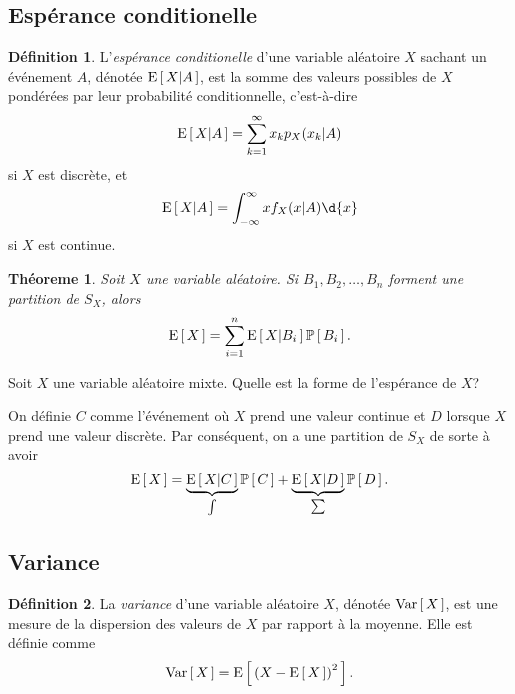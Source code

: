 \documentclass[11pt]{article}
\makeatletter
\renewcommand\P[1]{%
	\ensuremath{%
		\mathbb{P}\left[\,#1\,\right]%
	}%
}%
\newcommand\Esp[1]{%
	\ensuremath{%
		\mathrm{E}\left[\,#1\,\right]%
	}%
}%
\newcommand\Espg[2]{%
	\ensuremath{%
		\mathrm{E}\left[\,#1\middle\vert#2\,\right]%
	}%
}%
\newcommand\Var[1]{%
	\ensuremath{%
		\mathrm{Var}\left[\,#1\,\right]%
	}%
}%
\newtheorem{theoreme}{Théoreme}[section]
\theoremstyle{remark}
\theoremstyle{definition}
\newtheorem*{@definition}{Définition}
\newenvironment{definition}{%
	\begin{@definition}%
}{%
	\end{@definition}%
	\setcounter{property}{0}%
}
\makeatother
\begin{document}
\subsection{Espérance conditionelle}
\begin{definition}
	L'\textit{espérance conditionelle} d'une variable aléatoire $X$ sachant un
	événement $A$, dénotée $\Espg{X}{A}$, est la somme des valeurs possibles de
	$X$ pondérées par leur probabilité conditionnelle, c'est-à-dire
	\begin{equation*}
		\Espg{X}{A}=\sum_{k=1}^\infty x_kp_X(x_k|A)
	\end{equation*}
	si $X$ est discrète, et
	\begin{equation*}
		\Espg{X}{A}=\int_{-\infty}^\infty xf_X(x|A)\d{x}
	\end{equation*}
	si $X$ est continue.
\end{definition}

\begin{theoreme}
	Soit $X$ une variable aléatoire. Si $B_1,B_2,\dots,B_n$ forment une
	partition de $S_X$, alors
	\begin{equation*}
		\Esp{X}=\sum_{i=1}^n\Espg{X}{B_i}\P{B_i}.
	\end{equation*}
\end{theoreme}

\begin{exemple}
	Soit $X$ une variable aléatoire mixte. Quelle est la forme de l'espérance
	de $X$?

	On définie $C$ comme l'événement où $X$ prend une valeur continue et $D$
	lorsque $X$ prend une valeur discrète. Par conséquent, on a une partition
	de $S_X$ de sorte à avoir
	\begin{equation*}
		\Esp{X}
		=\underbrace{\Espg{X}{C}}_{\int}\P{C}
		+\underbrace{\Espg{X}{D}}_{\sum}\P{D}.
	\end{equation*}
\end{exemple}

\subsection{Variance}
\begin{definition}
	La \textit{variance} d'une variable aléatoire $X$, dénotée $\Var{X}$, est
	une mesure de la dispersion des valeurs de $X$ par rapport à la moyenne.
	Elle est définie comme
	\begin{equation*}
		\Var{X}=\Esp{\left(X-\Esp{X}\right)^2}.
	\end{equation*}
\end{definition}
\end{document}
